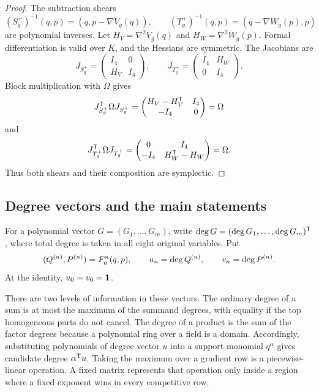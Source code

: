 \documentclass[11pt]{article}
\theoremstyle{remark}
\numberwithin{equation}{section}
\begin{document}
\begin{proof}
The subtraction shears
\[
(S_g^+)^{-1}(q,p)=(q,p-\nabla V_g(q)),\qquad
(T_g^+)^{-1}(q,p)=(q-\nabla W_g(p),p)
\]
are polynomial inverses.  Let \(H_V=\nabla^2V_g(q)\) and
\(H_W=\nabla^2W_g(p)\).  Formal differentiation is valid over \(K\), and
the Hessians are symmetric.  The Jacobians are
\[
J_{S_g^+}=
\begin{pmatrix}I_4&0\\H_V&I_4\end{pmatrix},
\qquad
J_{T_g^+}=
\begin{pmatrix}I_4&H_W\\0&I_4\end{pmatrix}.
\]
Block multiplication with \(\Omega\) gives
\[
J_{S_g^+}^{\mathsf{T}}\Omega J_{S_g^+}
=
\begin{pmatrix}
H_V-H_V^{\mathsf{T}}&I_4\\
-I_4&0
\end{pmatrix}
=\Omega
\]
and
\[
J_{T_g^+}^{\mathsf{T}}\Omega J_{T_g^+}
=
\begin{pmatrix}
0&I_4\\
-I_4&H_W^{\mathsf{T}}-H_W
\end{pmatrix}
=\Omega.
\]
Thus both shears and their composition are symplectic.
\end{proof}

\subsection{Degree vectors and the main statements}

For a polynomial vector \(G=(G_1,\ldots,G_m)\), write
\(\operatorname{deg} G=(\operatorname{deg} G_1,\ldots,\operatorname{deg} G_m)^{\mathsf{T}}\), where total degree is
taken in all eight original variables.  Put
\[
(Q^{(n)},P^{(n)})=F_g^n(q,p),
\qquad
u_n=\operatorname{deg} Q^{(n)},\qquad v_n=\operatorname{deg} P^{(n)}.
\]
At the identity, \(u_0=v_0=\mathbf{1}\).

There are two levels of information in these vectors.  The ordinary degree
of a sum is at most the maximum of the summand degrees, with equality if the
top homogeneous parts do not cancel.  The degree of a product is the sum of
the factor degrees because a polynomial ring over a field is a domain.
Accordingly, substituting polynomials of degree vector \(u\) into a support
monomial \(q^\alpha\) gives candidate degree
\(\alpha^{\mathsf{T}}u\).  Taking the maximum over a gradient row is a
piecewise-linear operation.  A fixed matrix represents that operation only
inside a region where a fixed exponent wins in every competitive row.
\end{document}
